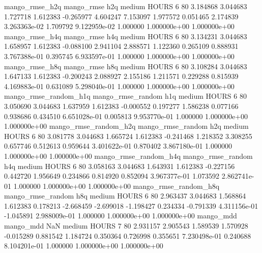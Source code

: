        mango_rmse_h2q        mango_rmse                  h2q     medium    HOURS                 6 80  3.184868       3.044683 1.727718       1.612383   -0.265977      4.604247      7.153097     1.977572       0.051465  2.174839 3.263363e-02     1.709792   9.122959e-02            1.000000    1.000000e+00        1.000000e+00
       mango_rmse_h4q        mango_rmse                  h4q     medium    HOURS                 6 80  3.134231       3.044683 1.658957       1.612383   -0.088100      2.941104      2.888571     1.122360       0.265109  0.888931 3.767388e-01     0.395745   6.933597e-01            1.000000    1.000000e+00        1.000000e+00
       mango_rmse_h8q        mango_rmse                  h8q     medium    HOURS                 6 80  3.108284       3.044683 1.647133       1.612383   -0.200243      2.088927      2.155186     1.211571       0.229288  0.815939 4.169883e-01     0.631089   5.298040e-01            1.000000    1.000000e+00        1.000000e+00
mango_rmse_random_h1q mango_rmse_random                  h1q     medium    HOURS                 6 80  3.050690       3.044683 1.637959       1.612383   -0.000552      0.197277      1.586238     0.077166       0.938686  0.434510 6.651028e-01     0.005813   9.953770e-01            1.000000    1.000000e+00        1.000000e+00
mango_rmse_random_h2q mango_rmse_random                  h2q     medium    HOURS                 6 80  3.081778       3.044683 1.665724       1.612383   -0.241468      1.218352      3.308255     0.657746       0.512613  0.959644 3.401622e-01     0.870402   3.867180e-01            1.000000    1.000000e+00        1.000000e+00
mango_rmse_random_h4q mango_rmse_random                  h4q     medium    HOURS                 6 80  3.058163       3.044683 1.643931       1.612383   -0.227156      0.442720      1.956649     0.234866       0.814920  0.852094 3.967377e-01     1.073592   2.862741e-01            1.000000    1.000000e+00        1.000000e+00
mango_rmse_random_h8q mango_rmse_random                  h8q     medium    HOURS                 6 80  2.963437       3.044683 1.568864       1.612383    0.178213     -2.668459     -2.699018    -1.198427       0.234334 -0.791339 4.311156e-01    -1.045891   2.988009e-01            1.000000    1.000000e+00        1.000000e+00
            mango_mdd         mango_mdd                  NaN     medium    HOURS                 7 80  2.931157       2.905543 1.589539       1.570928   -0.015289      0.881542      1.184724     0.350364       0.726998  0.355651 7.230498e-01     0.240688   8.104201e-01            1.000000    1.000000e+00        1.000000e+00
